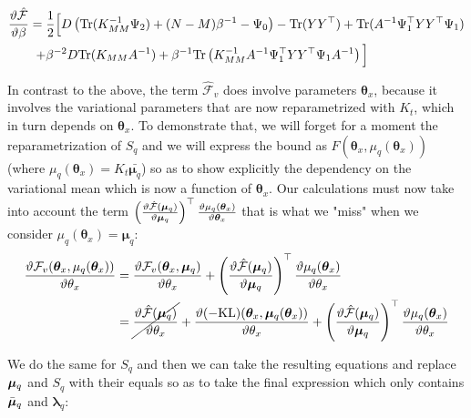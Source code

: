 \begin{align}
\frac{\vartheta \hat{\mathcal{F}}}{\vartheta \beta} ={}&
  \frac{1}{2} \Big[ 
      D \left( \text{Tr}(K_{MM}^{-1} \Psi_2) + (N-M)\beta^{-1} - \Psi_0 \right) - \text{Tr}(Y Y^{\top})
	  + \text{Tr}(A^{-1}\Psi_1^{\top} Y Y^{\top} \Psi_1) \nonumber \\
   +{}& \beta^{-2} D \text{Tr} ( K_{MM} A^{-1} ) + \beta^{-1} \text{Tr} \left( K_{MM}^{-1} A^{-1} \Psi_1^{\top} Y Y^{\top} \Psi_1 A^{-1} \right) \Big]
\label{derivb2}
\end{align}


In contrast to the above, the term $\hat{\mathcal{F}}_v$ does involve parameters $\boldsymbol \theta_x$, because it involves the variational parameters that are now reparametrized with $K_t$, which in turn depends on $\boldsymbol \theta_x$. 
To demonstrate that, we will forget for a moment the reparametrization of $S_q$ and we will express the bound as $F(\boldsymbol \theta_x, \mu_q (\boldsymbol \theta_x))$ (where $\mu_q (\boldsymbol \theta_x) = K_t \bar{\boldsymbol \mu_q}$) so as to show explicitly the dependency on the variational mean which is now a function of $\boldsymbol \theta_x$. Our calculations must now take into account the term
$
\left( \frac{\vartheta \hat{\mathcal{F}}(\boldsymbol \mu_q)}{\vartheta \boldsymbol \mu_q} \right)^{\top}
       \frac{\vartheta \mu_q (\boldsymbol \theta_x)}{\vartheta \boldsymbol \theta_x}
$
that is what we "miss" when we consider $\mu_q(\boldsymbol \theta_x) = \boldsymbol \mu_q$:
\begin{align}
\frac{\vartheta \mathcal{F}_v(\boldsymbol \theta_x, \mu_q(\boldsymbol \theta_x))}{\vartheta \theta_x} = {}&
	\frac{\vartheta \mathcal{F}_v(\boldsymbol \theta_x, \boldsymbol \mu_q)}{\vartheta \theta_x} 
  +  \left( \frac{\vartheta \hat{\mathcal{F}}(\boldsymbol \mu_q)}{\vartheta \boldsymbol \mu_q} \right)^{\top}
            \frac{\vartheta \mu_q(\boldsymbol \theta_x)}{\vartheta \theta_x} \nonumber \\
= {}&
 \cancel{
    \frac{\vartheta \hat{\mathcal{F}}(\boldsymbol \mu_q)}{\vartheta \theta_x}
  } +
  \frac{\vartheta (-\text{KL})(\boldsymbol \theta_x, \boldsymbol \mu_q(\boldsymbol \theta_x))}{\vartheta \theta_x}
+  \left( \frac{\vartheta \hat{\mathcal{F}}(\boldsymbol \mu_q)}{\vartheta \boldsymbol \mu_q} \right)^{\top}
            \frac{\vartheta \mu_q(\boldsymbol \theta_x)}{\vartheta \theta_x}
\label{meanReparamDerivFTheta}
\end{align}

We do the same for $S_q$ and then we can take the resulting equations and replace $\boldsymbol \mu_q$ and $S_q$ with their equals so as to take the final expression which only contains $\bar{\boldsymbol \mu}_q$ and $\boldsymbol \lambda_q$:


